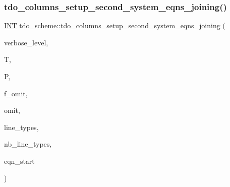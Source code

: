 \subsubsection{\texorpdfstring{tdo\+\_\+columns\+\_\+setup\+\_\+second\+\_\+system\+\_\+eqns\+\_\+joining()}{tdo\_columns\_setup\_second\_system\_eqns\_joining()}}
{\footnotesize\ttfamily \mbox{\hyperlink{galois_8h_a09fddde158a3a20bd2dcadb609de11dc}{I\+NT}} tdo\+\_\+scheme\+::tdo\+\_\+columns\+\_\+setup\+\_\+second\+\_\+system\+\_\+eqns\+\_\+joining (\begin{DoxyParamCaption}\item[{\mbox{\hyperlink{galois_8h_a09fddde158a3a20bd2dcadb609de11dc}{I\+NT}}}]{verbose\+\_\+level,  }\item[{\mbox{\hyperlink{classtdo__data}{tdo\+\_\+data}} \&}]{T,  }\item[{\mbox{\hyperlink{classpartitionstack}{partitionstack}} \&}]{P,  }\item[{\mbox{\hyperlink{galois_8h_a09fddde158a3a20bd2dcadb609de11dc}{I\+NT}}}]{f\+\_\+omit,  }\item[{\mbox{\hyperlink{galois_8h_a09fddde158a3a20bd2dcadb609de11dc}{I\+NT}}}]{omit,  }\item[{\mbox{\hyperlink{galois_8h_a09fddde158a3a20bd2dcadb609de11dc}{I\+NT}} $\ast$}]{line\+\_\+types,  }\item[{\mbox{\hyperlink{galois_8h_a09fddde158a3a20bd2dcadb609de11dc}{I\+NT}}}]{nb\+\_\+line\+\_\+types,  }\item[{\mbox{\hyperlink{galois_8h_a09fddde158a3a20bd2dcadb609de11dc}{I\+NT}}}]{eqn\+\_\+start }\end{DoxyParamCaption})}

\mbox{\label{classtdo__scheme_af52832a933312b6806a469a06562102f}} 
